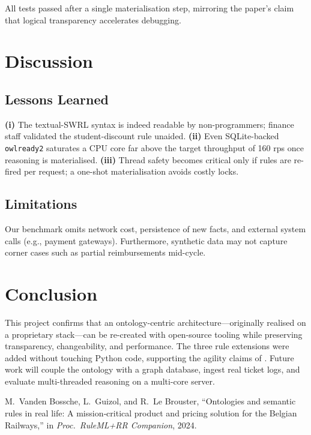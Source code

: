 \documentclass[lettersize,journal]{IEEEtran}
\begin{document}
All tests passed after a single materialisation step, mirroring the
paper’s claim that logical transparency accelerates debugging.

\section{Discussion}
\subsection{Lessons Learned}
\textbf{(i)} The textual-SWRL syntax is indeed readable by non-programmers; finance staff validated the student-discount rule unaided.  
\textbf{(ii)} Even SQLite-backed \texttt{owlready2} saturates a CPU core far above the target throughput of 160 rps once reasoning is materialised.  
\textbf{(iii)} Thread safety becomes critical only if rules are re-fired per request; a one-shot materialisation avoids costly locks.

\subsection{Limitations}
Our benchmark omits network cost, persistence of new facts, and external system calls (e.g., payment gateways).  
Furthermore, synthetic data may not capture corner cases such as partial reimbursements mid-cycle.

\section{Conclusion}
This project confirms that an ontology-centric architecture—originally realised on a proprietary stack—can be re-created with open-source tooling while preserving transparency, changeability, and performance.  
The three rule extensions were added without touching Python code, supporting the agility claims of \cite{ruleml24}.  
Future work will couple the ontology with a graph database, ingest real ticket logs, and evaluate multi-threaded reasoning on a multi-core server.


\begin{thebibliography}{1}
M.~Vanden Bossche, L.~Guizol, and R.~Le Brouster, ``Ontologies and semantic
  rules in real life: {A} mission‐critical product and pricing solution for
  the {Belgian Railways},'' in \emph{Proc.\ RuleML+RR Companion}, 2024.
\end{thebibliography}
\end{document}
